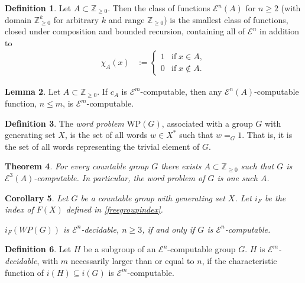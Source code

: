 \documentclass[a4paper]{article}
\newcommand{\grz}[1]{$\mathcal{E}^{#1}$}	%
\newcommand{\Zpos}{\mathbb{Z}_{\geq 0}}
\theoremstyle{plain}
\newtheorem{theorem}{Theorem}[section]
\newtheorem{corollary}[theorem]{Corollary}
\theoremstyle{definition}
\newtheorem{lemma}[theorem]{Lemma}
\newtheorem{definition}[theorem]{Definition}
\begin{document}
\begin{definition} \cite[Definition 2.3]{Cannonito_1973}
	Let $A \subset \Zpos$. Then the class of functions \grz{n}$(A)$ for $n \geq 2$ (with domain $\Zpos^k$ for arbitrary $k$ and range $\Zpos$) is the smallest class of functions, closed under composition and bounded recursion, containing all of \grz{n} in addition to 
	\begin{align}
		\chi_A(x) &:= \begin{cases}
									1 & \textrm{if}\; x \in A, \\
									0 & \textrm{if}\;  x \notin A.
							\end{cases}
	\end{align}
\end{definition}
\begin{lemma} \label{relativetonormalcomputable}
	Let $A \subset \Zpos$. If $c_A$ is \grz{m}-computable, then any \grz{n}$(A)$-computable function, $n \leq m$, is \grz{m}-computable.
\end{lemma}

\begin{definition}
	The {\it word problem} WP$(G)$, associated with a group $G$ with generating set $X$, is the set of all words $w \in X^{\ast}$ such that $w =_G 1$. That is, it is the set of all words representing the trivial element of $G$.
\end{definition}

\begin{theorem} \cite[Theorem 3.2]{Cannonito_1973} \label{wp-computable-implies-group}
	For every countable group $G$ there exists $A \subset \Zpos$ such that $G$ is \grz{3}$(A)$-computable. In particular, the word problem of $G$ is one such $A$.
\end{theorem}

\begin{corollary} \label{wp-iff-group}
	Let $G$ be a countable group with generating set $X$. Let $i_F$ be the index of $F(X)$ defined in \ref{freegroupindex}.
	
	$i_F(WP(G))$ is \grz{n}-decidable, $n \geq 3$, if and only if $G$ is \grz{n}-computable. 
\end{corollary}

\begin{definition}
	Let $H$ be a subgroup of an \grz{n}-computable group $G$. $H$ is {\it \grz{m}-decidable}, with $m$ necessarily larger than or equal to $n$, if the characteristic function of $i(H) \subseteq i(G)$ is \grz{m}-computable.
\end{definition}
\end{document}
